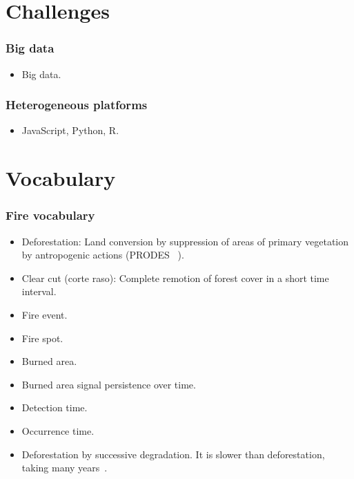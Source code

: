 \documentclass{beamer}
\begin{document}
\section{Challenges}

\begin{frame}[t, allowframebreaks]
    \frametitle{Big data}
    \begin{itemize}
        \item Big data.
    \end{itemize}
\end{frame}



\begin{frame}[t, allowframebreaks]
    \frametitle{Heterogeneous platforms}
    \begin{itemize}
        \item JavaScript, Python, R.
    \end{itemize}
\end{frame}



\section{Vocabulary}

\begin{frame}[t, allowframebreaks]
    \frametitle{Fire vocabulary}
    \begin{itemize}
        \item Deforestation: Land conversion by suppression of areas of 
            primary vegetation by antropogenic actions (PRODES
            ~\cite{dealmeida2022}). 
        \item Clear cut (corte raso): Complete remotion of forest cover in a 
            short time interval.
        \item Fire event.
        \item Fire spot.
        \item Burned area.
        \item Burned area signal persistence over time.
        \item Detection time.
        \item Occurrence time.
        \item Deforestation by successive degradation. It is slower than 
            deforestation, taking many years~\cite{dealmeida2022}.
    \end{itemize}
\end{frame}
\end{document}
